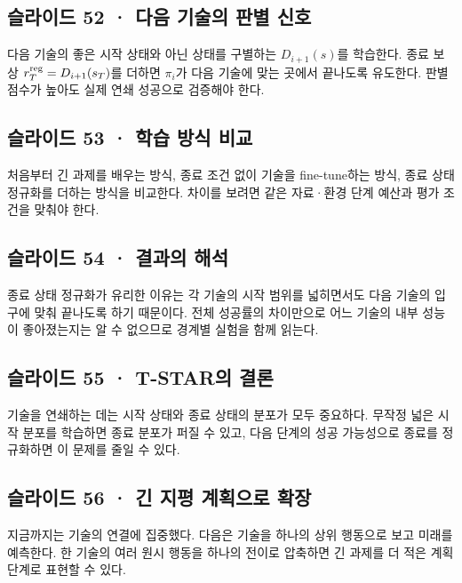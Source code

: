 \documentclass[11pt,a4paper]{article}
\begin{document}
\subsection{슬라이드 52 · 다음 기술의 판별 신호}

다음 기술의 좋은 시작 상태와 아닌 상태를 구별하는 $D_{i+1}(s)$를 학습한다. 종료 보상 $r_T^{\rm reg}=D_{i+1}(s_T)$를 더하면 $\pi_i$가 다음 기술에 맞는 곳에서 끝나도록 유도한다. 판별 점수가 높아도 실제 연쇄 성공으로 검증해야 한다.\par

\subsection{슬라이드 53 · 학습 방식 비교}

처음부터 긴 과제를 배우는 방식, 종료 조건 없이 기술을 fine-tune하는 방식, 종료 상태 정규화를 더하는 방식을 비교한다. 차이를 보려면 같은 자료·환경 단계 예산과 평가 조건을 맞춰야 한다.\par

\subsection{슬라이드 54 · 결과의 해석}

종료 상태 정규화가 유리한 이유는 각 기술의 시작 범위를 넓히면서도 다음 기술의 입구에 맞춰 끝나도록 하기 때문이다. 전체 성공률의 차이만으로 어느 기술의 내부 성능이 좋아졌는지는 알 수 없으므로 경계별 실험을 함께 읽는다.\par

\subsection{슬라이드 55 · T-STAR의 결론}

기술을 연쇄하는 데는 시작 상태와 종료 상태의 분포가 모두 중요하다. 무작정 넓은 시작 분포를 학습하면 종료 분포가 퍼질 수 있고, 다음 단계의 성공 가능성으로 종료를 정규화하면 이 문제를 줄일 수 있다.\par

\subsection{슬라이드 56 · 긴 지평 계획으로 확장}

지금까지는 기술의 연결에 집중했다. 다음은 기술을 하나의 상위 행동으로 보고 미래를 예측한다. 한 기술의 여러 원시 행동을 하나의 전이로 압축하면 긴 과제를 더 적은 계획 단계로 표현할 수 있다.\par
\end{document}

